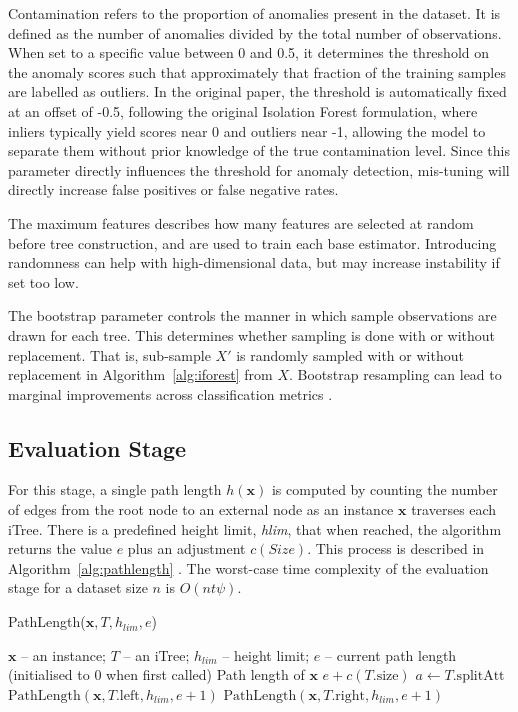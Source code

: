 \documentclass[10pt, conference]{IEEEtran}
\begin{document}
Contamination refers to the proportion of anomalies present in the dataset. It is defined as the number of anomalies divided by the total number of observations. When set to a specific value between 0 and 0.5, it determines the threshold on the anomaly scores such that approximately that fraction of the training samples are labelled as outliers. In the original paper, the threshold is automatically fixed at an offset of -0.5, following the original Isolation Forest formulation, where inliers typically yield scores near 0 and outliers near -1, allowing the model to separate them without prior knowledge of the true contamination level. Since this parameter directly influences the threshold for anomaly detection, mis-tuning will directly increase false positives or false negative rates.

The maximum features describes how many features are selected at random before tree construction, and are used to train each base estimator. Introducing randomness can help with high-dimensional data, but may increase instability if set too low.

The bootstrap parameter controls the manner in which sample observations are drawn for each tree. This determines whether sampling is done with or without replacement. That is, sub-sample $X'$ is randomly sampled with or without replacement in Algorithm~\ref{alg:iforest} from $X$. Bootstrap resampling can lead to marginal improvements across classification metrics \cite{Choi2025Impact}.

\subsection{Evaluation Stage}
For this stage, a single path length $h(\boldsymbol{x})$ is computed by counting the number of edges from the root node to an external node as an instance $\boldsymbol{x}$ traverses each iTree. There is a predefined height limit, \textit{hlim}, that when reached, the algorithm returns the value $e$ plus an adjustment $c(Size)$. This process is described in Algorithm~\ref{alg:pathlength} \cite{iforest2}. The worst-case time complexity of the evaluation stage for a dataset size $n$ is $O(nt \psi)$.

\begin{algorithm}[H]
	\caption{PathLength($\boldsymbol{x}, T, h_{lim}, e$)}
	\label{alg:pathlength}
	\begin{algorithmic}[1]
		\Require $\boldsymbol{x}$ -- an instance; $T$ -- an iTree; $h_{lim}$ -- height limit; $e$ -- current path length (initialised to 0 when first called)
		\Ensure Path length of $\boldsymbol{x}$
		\State \Return $e + c(T.\text{size})$ 
		\Else
		\State $a \gets T.\text{splitAtt}$
		\State \Return $\text{PathLength}(\boldsymbol{x}, T.\text{left}, h_{lim}, e + 1)$
		\Else
		\State \Return $\text{PathLength}(\boldsymbol{x}, T.\text{right}, h_{lim}, e + 1)$
		\EndIf
		\EndIf
	\end{algorithmic}
\end{algorithm}
\end{document}
